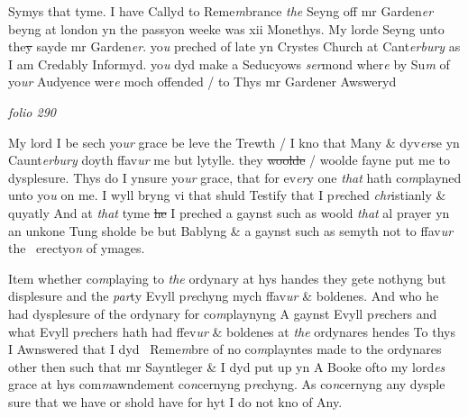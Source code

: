 \documentclass[12pt, a4paper]{book}
\begin{document}
			
		\ifthenelse{\isodd{\thepage}}
		{\reversemarginpar}
		{\normalmarginpar}
		Symys that tyme. I have Callyd to Reme\textit{m}brance \textit{the} Seyng off mr Garden\textit{er} beyng
at london yn the passyon weeke was xii Monethys. My lorde Seyng unto
 the\sout{y} sayde mr Garden\textit{er}. yo\textit{u} preched of late yn Crystes Church at Cant\textit{erbury}
as I am Credably Informyd. yo\textit{u} dyd make a Seducyows \textit{ser}mond wher\textit{e} by 
Su\textit{m} of yo\textit{ur} Audyence wer\textit{e} moch offended / to Thys mr Gardener Awsweryd

\dotfill
						\newpage
{}

\textit{folio 290}



	
		\ifthenelse{\isodd{\thepage}}
		{\reversemarginpar}
		{\normalmarginpar}
		My lord I be sech yo\textit{ur} grace be leve the Trewth / I kno that Many \& dyv\textit{er}se
yn Caunt\textit{erbury} doyth ffav\textit{ur} me but lytylle. they \sout{woolde }/ woolde fayne put me to
dysplesure. Thys do I ynsure yo\textit{ur} grace, that for ev\textit{er}y one \textit{that} hath co\textit{m}playned
unto yo\textit{u} on me. I wyll bryng vi that shuld Testify that I p\textit{re}ched \textit{chr}istianly
\& quyatly And at \textit{that} tyme \sout{he }
               I
			 preched a gaynst such as woold \textit{that} al prayer yn an
unkone Tung sholde be but Bablyng \& a gaynst such as semyth not to ffav\textit{ur} the 
erectyo\textit{n} of ymages.
	
		\ifthenelse{\isodd{\thepage}}
		{\reversemarginpar}
		{\normalmarginpar}
		Item whether co\textit{m}playing to \textit{the} ordynary at hys handes they gete nothyng but
displesure and the \textit{par}ty Evyll p\textit{re}chyng mych ffav\textit{ur} \& boldenes. And who he
had dysplesure of the ordynary for co\textit{m}playnyng A gaynst Evyll p\textit{re}chers and
what Evyll p\textit{re}chers hath had ffev\textit{ur} \& boldenes at \textit{the} ordynares hendes
To thys I Awnswered that I dyd 
			 Reme\textit{m}bre of no co\textit{m}playntes made to the ordynares
other then such that mr Sayntleger \& I dyd put up yn A Booke ofto my
lord\textit{es} grace at hys com\textit{m}awndement co\textit{n}cernyng p\textit{re}chyng. As co\textit{n}cernyng any dysple
sure that we have or shold have for hyt I do not kno of Any. 
	
\end{document}
